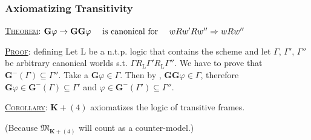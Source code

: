 \documentclass[xcolor=x11names]{beamer}
\newcommand{\bemph}[1] {{\color{DeepSkyBlue3}{#1}}}
\newcommand{\FB}{\mathbf G}
\newcommand{\dzsa}[1]{\textsc{\underline{#1}}:}
\newcommand{\lthen}{\rightarrow}
\begin{document}


\begin{frame}[t]
\frametitle{Axiomatizing Transitivity}
\footnotesize
\dzsa{Theorem} $\FB \varphi \lthen \FB \FB \varphi \quad \textup{ is canonical for }\quad w Rw'Rw'' \Rightarrow w R w''$

\bigskip

\dzsa{Proof} defining
Let $\mathrm{L}$ be a n.t.p. logic that contains the scheme \bemph{(4)} and let $\Gamma$, $\Gamma'$, $\Gamma''$  be arbitrary canonical worlds s.t. $\Gamma R_{\mathrm{L}} \Gamma' R_{\mathrm L} \Gamma''$. We have to prove that $\FB^-(\Gamma)\subseteq \Gamma''$. Take a $\FB\varphi \in \Gamma$. Then by \bemph{(4)}, $\FB\FB \varphi \in \Gamma$, therefore $\FB \varphi \in {\FB}^-(\Gamma)\subseteq \Gamma'$ and $\varphi \in {\FB}^-(\Gamma')\subseteq \Gamma''$.

\bigskip

\dzsa{Corollary} $\mathbf K + (4)$ axiomatizes the logic of transitive frames.


\begin{center}{\scriptsize (Because $\mathfrak M_{\mathbf K + (4)}$ will count as a counter-model.)}\end{center}
\end{frame}

\end{document}
